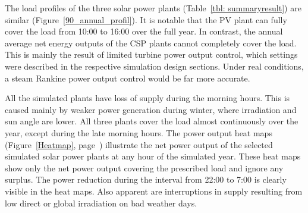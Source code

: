 The load profiles of the three solar power plants (Table~\ref{tbl: summaryresult}) are similar (Figure~\ref{90_annual_profil}). It is notable that the \ac{PV} plant can fully cover the load from 10:00 to 16:00 over the full year. In contrast, the annual average net energy outputs of the \ac{CSP} plants cannot completely cover the load. This is mainly the result of limited turbine power output control, which settings were described in the respective simulation design sections. Under real conditions, a steam Rankine power output control would be far more accurate. 


All the simulated plants have loss of supply during the morning hours. This is caused mainly by weaker power generation during winter, where irradiation and sun angle are lower. All three plants cover the load almost continuously over the year, except during the late morning hours. The power output heat maps (Figure~\ref{Heatmap}, page~\pageref{Heatmap}) illustrate the net power output of the selected simulated solar power plants at any hour of the simulated year. These heat maps show only the net power output covering the prescribed load and ignore any surplus. The power reduction during the interval from 22:00 to 7:00 is clearly visible in the heat maps. Also apparent are interruptions in supply resulting from low direct or global irradiation on bad weather days. 

